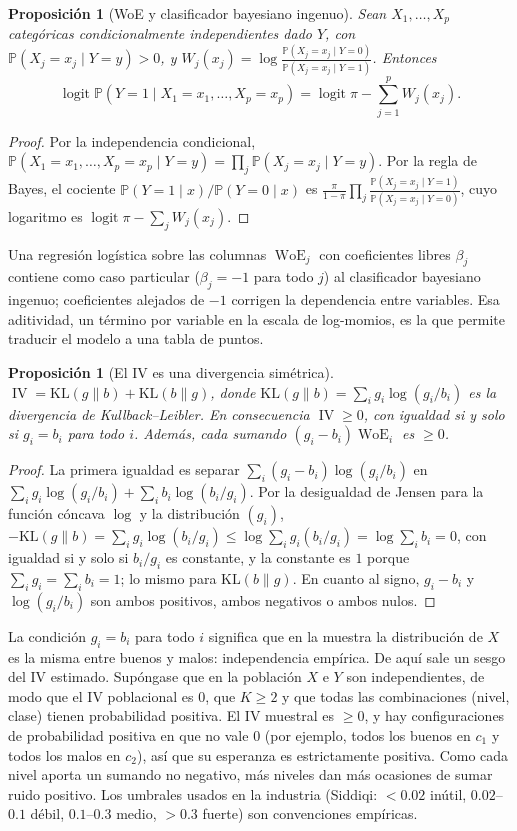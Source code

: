 \documentclass[11pt,a4paper]{article}
\theoremstyle{plain}
\newtheorem{proposicion}[teorema]{Proposición}
\theoremstyle{definition}
\theoremstyle{remark}
\newcommand{\Prob}{\mathbb{P}}
\newcommand{\logit}{\operatorname{logit}}
\newcommand{\WoE}{\operatorname{WoE}}
\newcommand{\IV}{\operatorname{IV}}
\newcommand{\1}{\mathbf{1}}
\begin{document}
\begin{proposicion}[WoE y clasificador bayesiano ingenuo]\label{prop:woe-nb}
Sean $X_1,\dots,X_p$ categóricas condicionalmente independientes dado
$Y$, con $\Prob(X_j=x_j\mid Y=y)>0$, y
$W_j(x_j)=\log\frac{\Prob(X_j=x_j\mid Y=0)}{\Prob(X_j=x_j\mid Y=1)}$.
Entonces
\[
\logit\Prob(Y=1\mid X_1=x_1,\dots,X_p=x_p)=\logit\pi-\sum_{j=1}^pW_j(x_j).
\]
\end{proposicion}

\begin{proof}
Por la independencia condicional,
$\Prob(X_1=x_1,\dots,X_p=x_p\mid Y=y)=\prod_j\Prob(X_j=x_j\mid Y=y)$. Por
la regla de Bayes, el cociente $\Prob(Y=1\mid x)/\Prob(Y=0\mid x)$ es
$\frac{\pi}{1-\pi}\prod_j\frac{\Prob(X_j=x_j\mid Y=1)}{\Prob(X_j=x_j\mid Y=0)}$,
cuyo logaritmo es $\logit\pi-\sum_jW_j(x_j)$.
\end{proof}

Una regresión logística sobre las columnas $\WoE_j$ con coeficientes
libres $\beta_j$ contiene como caso particular ($\beta_j=-1$ para todo $j$)
al clasificador bayesiano ingenuo; coeficientes alejados de $-1$ corrigen
la dependencia entre variables. Esa aditividad, un término por variable en
la escala de log-momios, es la que permite traducir el modelo a una tabla
de puntos.

\begin{proposicion}[El IV es una divergencia simétrica]\label{prop:iv}
$\IV=\mathrm{KL}(g\|b)+\mathrm{KL}(b\|g)$, donde
$\mathrm{KL}(g\|b)=\sum_ig_i\log(g_i/b_i)$ es la divergencia de
Kullback--Leibler. En consecuencia $\IV\ge0$, con igualdad si y solo si
$g_i=b_i$ para todo $i$. Además, cada sumando $(g_i-b_i)\WoE_i$ es $\ge0$.
\end{proposicion}

\begin{proof}
La primera igualdad es separar $\sum_i(g_i-b_i)\log(g_i/b_i)$ en
$\sum_ig_i\log(g_i/b_i)+\sum_ib_i\log(b_i/g_i)$. Por la desigualdad de
Jensen para la función cóncava $\log$ y la distribución $(g_i)$,
$-\mathrm{KL}(g\|b)=\sum_ig_i\log(b_i/g_i)\le\log\sum_ig_i(b_i/g_i)=\log\sum_ib_i=0$,
con igualdad si y solo si $b_i/g_i$ es constante, y la constante es $1$
porque $\sum_ig_i=\sum_ib_i=1$; lo mismo para $\mathrm{KL}(b\|g)$. En
cuanto al signo, $g_i-b_i$ y $\log(g_i/b_i)$ son ambos positivos, ambos
negativos o ambos nulos.
\end{proof}

La condición $g_i=b_i$ para todo $i$ significa que en la muestra la
distribución de $X$ es la misma entre buenos y malos: independencia
empírica. De aquí sale un sesgo del IV estimado. Supóngase que en la
población $X$ e $Y$ son independientes, de modo que el IV poblacional es
$0$, que $K\ge2$ y que todas las combinaciones (nivel, clase) tienen
probabilidad positiva. El IV muestral es $\ge0$, y hay configuraciones de
probabilidad positiva en que no vale $0$ (por ejemplo, todos los buenos en
$c_1$ y todos los malos en $c_2$), así que su esperanza es estrictamente
positiva. Como cada nivel aporta un sumando no negativo, más niveles dan
más ocasiones de sumar ruido positivo. Los umbrales usados en la industria
(Siddiqi: $<0.02$ inútil, $0.02$--$0.1$ débil, $0.1$--$0.3$ medio, $>0.3$
fuerte) son convenciones empíricas.
\end{document}

